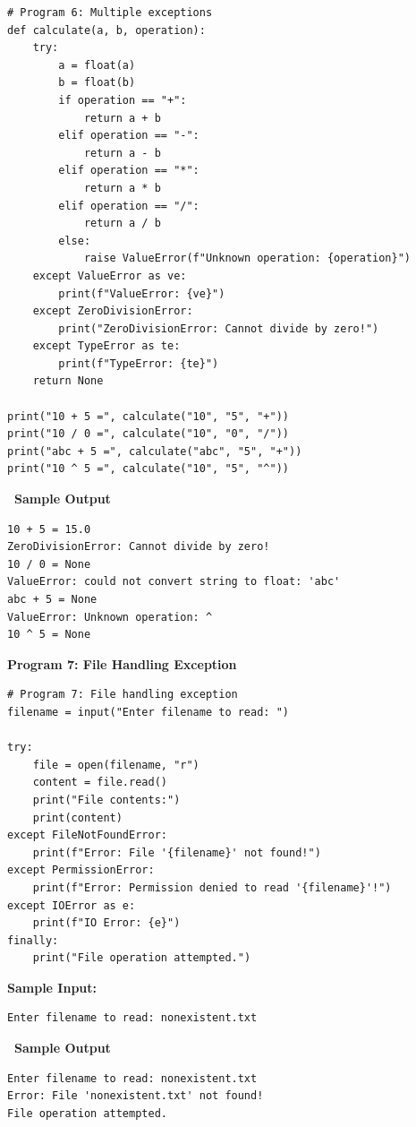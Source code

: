 \documentclass[12pt,a4paper]{article}
\newcommand{\outhead}{\noindent\colorbox{cmrgreen!25}%
  {\textbf{\small\color{cmrdark}~Sample Output~}}\par\vspace{-1pt}}
\begin{document}
\begin{lstlisting}
# Program 6: Multiple exceptions
def calculate(a, b, operation):
    try:
        a = float(a)
        b = float(b)
        if operation == "+":
            return a + b
        elif operation == "-":
            return a - b
        elif operation == "*":
            return a * b
        elif operation == "/":
            return a / b
        else:
            raise ValueError(f"Unknown operation: {operation}")
    except ValueError as ve:
        print(f"ValueError: {ve}")
    except ZeroDivisionError:
        print("ZeroDivisionError: Cannot divide by zero!")
    except TypeError as te:
        print(f"TypeError: {te}")
    return None

print("10 + 5 =", calculate("10", "5", "+"))
print("10 / 0 =", calculate("10", "0", "/"))
print("abc + 5 =", calculate("abc", "5", "+"))
print("10 ^ 5 =", calculate("10", "5", "^"))
\end{lstlisting}

\outhead
\begin{lstlisting}[style=outputstyle]
10 + 5 = 15.0
ZeroDivisionError: Cannot divide by zero!
10 / 0 = None
ValueError: could not convert string to float: 'abc'
abc + 5 = None
ValueError: Unknown operation: ^
10 ^ 5 = None
\end{lstlisting}

\vspace{0.5cm}

\textbf{Program 7: File Handling Exception}

\begin{lstlisting}
# Program 7: File handling exception
filename = input("Enter filename to read: ")

try:
    file = open(filename, "r")
    content = file.read()
    print("File contents:")
    print(content)
except FileNotFoundError:
    print(f"Error: File '{filename}' not found!")
except PermissionError:
    print(f"Error: Permission denied to read '{filename}'!")
except IOError as e:
    print(f"IO Error: {e}")
finally:
    print("File operation attempted.")
\end{lstlisting}

\textbf{Sample Input:}
\begin{verbatim}
Enter filename to read: nonexistent.txt
\end{verbatim}

\outhead
\begin{lstlisting}[style=outputstyle]
Enter filename to read: nonexistent.txt
Error: File 'nonexistent.txt' not found!
File operation attempted.
\end{lstlisting}
\end{document}
